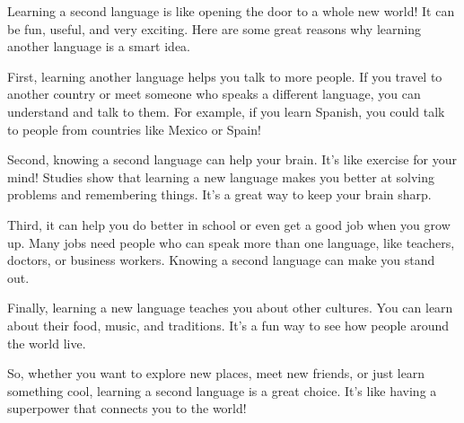 \documentclass[12pt]{article}
\begin{document}
\begin{tcolorbox}[colframe=black!60, colback=white, 
coltitle=black, colbacktitle=black!15, fonttitle=\bfseries\Large, 
title=Examples, halign title=center, left=10pt, right=10pt, top=10pt, bottom=15pt]
     \end{tcolorbox}

\vspace{1em}

\begin{tcolorbox}[colframe=black!60, colback=white, 
coltitle=black, colbacktitle=black!15, fonttitle=\bfseries\Large, 
title=Text: Should You Learn Another Language, halign title=center, left=10pt, right=10pt, top=10pt, bottom=15pt]
Learning a second language is like opening the door to a whole new world! It can be fun, useful, and very exciting. Here are some great reasons why learning another language is a smart idea.

First, learning another language helps you talk to more people. If you travel to another country or meet someone who speaks a different language, you can understand and talk to them. For example, if you learn Spanish, you could talk to people from countries like Mexico or Spain!

Second, knowing a second language can help your brain. It’s like exercise for your mind! Studies show that learning a new language makes you better at solving problems and remembering things. It’s a great way to keep your brain sharp.

Third, it can help you do better in school or even get a good job when you grow up. Many jobs need people who can speak more than one language, like teachers, doctors, or business workers. Knowing a second language can make you stand out.

Finally, learning a new language teaches you about other cultures. You can learn about their food, music, and traditions. It’s a fun way to see how people around the world live.

So, whether you want to explore new places, meet new friends, or just learn something cool, learning a second language is a great choice. It’s like having a superpower that connects you to the world!


 

     \end{tcolorbox}
\end{document}
